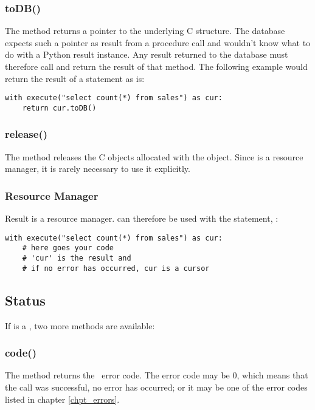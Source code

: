 \subsubsection{toDB()}
The method returns a  pointer
to the underlying C structure.
The database expects such a pointer
as result from a procedure call and
wouldn't know what to do
with a Python result instance.
Any result returned to the database
must therefore call  
and return the result of that method.
The following example would return
the result of a statement as is:

\begin{python}
\begin{lstlisting}
with execute("select count(*) from sales") as cur:
    return cur.toDB()
\end{lstlisting}
\end{python}

\subsubsection{release()}
The method releases the C objects
allocated with the  object.
Since  is a resource manager,
it is rarely necessary to use it explicitly.

\subsubsection{Resource Manager}
Result is a resource manager.
 can therefore
be used with the  statement, \eg:

\begin{python}
\begin{lstlisting}
with execute("select count(*) from sales") as cur:
    # here goes your code
    # 'cur' is the result and
    # if no error has occurred, cur is a cursor
\end{lstlisting}
\end{python}

\subsection{Status}
If  is a ,
two more methods are available:

\subsubsection{code()}
The method returns the \nowdb\ error code.
The error code may be 0,
which means that the call was successful,
no error has occurred;
or it may be one of the error codes listed in
chapter \ref{chpt_errors}.

